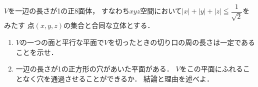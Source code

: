 \documentclass[../../main.tex]{subfiles}
\begin{document}
$V$を一辺の長さが1の正8面体，
すなわち$xyz$空間において$\displaystyle |x|+|y|+|z| \leqq \dfrac{1}{\sqrt2}$をみたす
点$(x,y,z)$の集合と合同な立体とする．
\begin{enumerate}
  \item $V$の一つの面と平行な平面で$V$を切ったときの切り口の周の長さは一定であることを示せ．
  \item 一辺の長さが1の正方形の穴があいた平面がある．
    $V$をこの平面にふれることなく穴を通過させることができるか．
    結論と理由を述べよ．
\end{enumerate}
\end{document}
